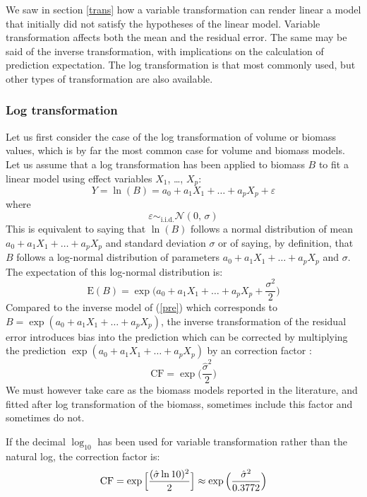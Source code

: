 We saw in section \ref{trans} how a variable transformation can render linear a model that initially did not satisfy the hypotheses of the linear model. Variable transformation affects both the mean and the residual error. The same may be said of the inverse transformation, with implications on the calculation of prediction expectation. The log transformation is that most commonly used, but other types of transformation are also available.

\subsubsection{Log transformation}

Let us first consider the case of the log transformation of volume or biomass values, which is by far the most common case for volume and biomass models. Let us assume that a log transformation has been applied to biomass $B$
to fit a linear model using effect variables $X_1$, \ldots, $X_p$:
\begin{equation}
Y=\ln(B)=a_0+a_1X_1+\ldots+a_pX_p+\varepsilon\label{pre}
\end{equation}
where
\[
\varepsilon\mathop{\sim}_{\mathrm{i.i.d.}}\mathcal{N}(0,\,\sigma)
\]
This is equivalent to saying that $\ln(B)$ follows a normal distribution of mean 
$a_0+a_1X_1+\ldots+a_pX_p$ and standard deviation $\sigma$ or of saying, by definition, that $B$ follows a log-normal distribution of parameters 
$a_0+a_1X_1+\ldots+a_pX_p$ and $\sigma$. The expectation of this log-normal distribution is:
\[
\mbox{E}(B)=\exp\Big(a_0+a_1X_1+\ldots+a_pX_p+\frac{\sigma^2}{2}\Big)
\]
Compared to the inverse model of (\ref{pre}) which corresponds to 
$B=\exp(a_0+a_1X_1+\ldots+a_pX_p)$, the inverse transformation of the residual error introduces bias into the prediction which can be corrected by multiplying the prediction 
$\exp(a_0+a_1X_1+\ldots+a_pX_p)$ by an correction factor 
\citep{parresol99}:
\begin{equation}
\mathrm{CF}=\exp\Big(\frac{\hat{\sigma}^2}{2}\Big)\label{CF}
\end{equation}
We must however take care as the biomass models reported in the literature, and fitted after log transformation of the biomass, sometimes include this factor and sometimes do not.

If the decimal $\log_{10}$ has been used for variable transformation rather than the natural log, the correction factor is:
\[
\mathrm{CF}=\exp\Big[\frac{(\hat{\sigma}\ln 10)^2}{2}\Big]\approx
\exp\Big(\frac{\hat{\sigma}^2}{\mbox{0.3772}}\Big)
\]

